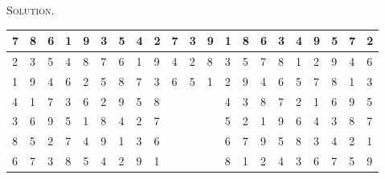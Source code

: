 \documentclass[12pt, a4paper, oneside]{article}
\newenvironment{solution}{\par\noindent\textsc{Solution. }}{\\\par}
\begin{document}
\begin{solution}
\begin{table}[]
\begin{tabular}{llllll|l|l|l|lll|l|l|l|llllll}
				\multicolumn{1}{|l|}{7} & \multicolumn{1}{l|}{8} & \multicolumn{1}{l|}{6} & \multicolumn{1}{l|}{1} & \multicolumn{1}{l|}{9} & 3 & 5 & 4 & 2 & \multicolumn{1}{l|}{7} & \multicolumn{1}{l|}{3} & 9 & 1 & 8 & 6 & \multicolumn{1}{l|}{3} & \multicolumn{1}{l|}{4} & \multicolumn{1}{l|}{9} & \multicolumn{1}{l|}{5} & \multicolumn{1}{l|}{7} & \multicolumn{1}{l|}{2} \\ \hline
				\multicolumn{1}{|l|}{2} & \multicolumn{1}{l|}{3} & \multicolumn{1}{l|}{5} & \multicolumn{1}{l|}{4} & \multicolumn{1}{l|}{8} & 7 & 6 & 1 & 9 & \multicolumn{1}{l|}{4} & \multicolumn{1}{l|}{2} & 8 & 3 & 5 & 7 & \multicolumn{1}{l|}{8} & \multicolumn{1}{l|}{1} & \multicolumn{1}{l|}{2} & \multicolumn{1}{l|}{9} & \multicolumn{1}{l|}{4} & \multicolumn{1}{l|}{6} \\ \hline
				\multicolumn{1}{|l|}{1} & \multicolumn{1}{l|}{9} & \multicolumn{1}{l|}{4} & \multicolumn{1}{l|}{6} & \multicolumn{1}{l|}{2} & 5 & 8 & 7 & 3 & \multicolumn{1}{l|}{6} & \multicolumn{1}{l|}{5} & 1 & 2 & 9 & 4 & \multicolumn{1}{l|}{6} & \multicolumn{1}{l|}{5} & \multicolumn{1}{l|}{7} & \multicolumn{1}{l|}{8} & \multicolumn{1}{l|}{1} & \multicolumn{1}{l|}{3} \\ \hline
				\multicolumn{1}{|l|}{4} & \multicolumn{1}{l|}{1} & \multicolumn{1}{l|}{7} & \multicolumn{1}{l|}{3} & \multicolumn{1}{l|}{6} & 2 & 9 & 5 & 8 & ~                      & ~                      & ~ & 4 & 3 & 8 & \multicolumn{1}{l|}{7} & \multicolumn{1}{l|}{2} & \multicolumn{1}{l|}{1} & \multicolumn{1}{l|}{6} & \multicolumn{1}{l|}{9} & \multicolumn{1}{l|}{5} \\ \cline{1-9} \cline{13-21} 
				\multicolumn{1}{|l|}{3} & \multicolumn{1}{l|}{6} & \multicolumn{1}{l|}{9} & \multicolumn{1}{l|}{5} & \multicolumn{1}{l|}{1} & 8 & 4 & 2 & 7 & ~                      & ~                      & ~ & 5 & 2 & 1 & \multicolumn{1}{l|}{9} & \multicolumn{1}{l|}{6} & \multicolumn{1}{l|}{4} & \multicolumn{1}{l|}{3} & \multicolumn{1}{l|}{8} & \multicolumn{1}{l|}{7} \\ \cline{1-9} \cline{13-21} 
				\multicolumn{1}{|l|}{8} & \multicolumn{1}{l|}{5} & \multicolumn{1}{l|}{2} & \multicolumn{1}{l|}{7} & \multicolumn{1}{l|}{4} & 9 & 1 & 3 & 6 & ~                      & ~                      & ~ & 6 & 7 & 9 & \multicolumn{1}{l|}{5} & \multicolumn{1}{l|}{8} & \multicolumn{1}{l|}{3} & \multicolumn{1}{l|}{4} & \multicolumn{1}{l|}{2} & \multicolumn{1}{l|}{1} \\ \cline{1-9} \cline{13-21} 
				\multicolumn{1}{|l|}{6} & \multicolumn{1}{l|}{7} & \multicolumn{1}{l|}{3} & \multicolumn{1}{l|}{8} & \multicolumn{1}{l|}{5} & 4 & 2 & 9 & 1 & ~                      & ~                      & ~ & 8 & 1 & 2 & \multicolumn{1}{l|}{4} & \multicolumn{1}{l|}{3} & \multicolumn{1}{l|}{6} & \multicolumn{1}{l|}{7} & \multicolumn{1}{l|}{5} & \multicolumn{1}{l|}{9} \\ \cline{1-9} \cline{13-21} 

\end{tabular}
\end{table}
\end{solution}
\end{document}
